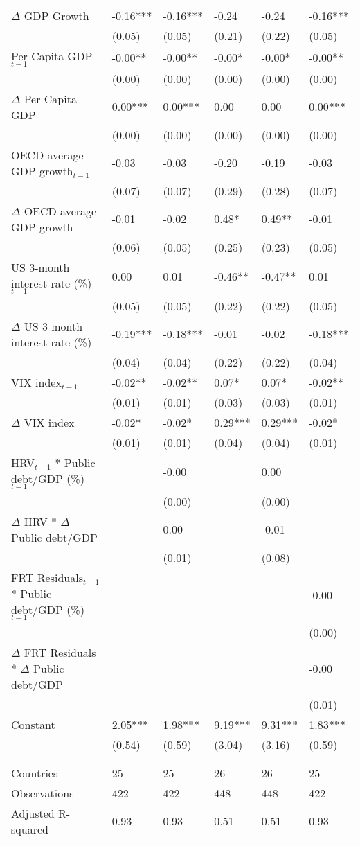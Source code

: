 \begin{tabular}{lp{3cm}p{3cm}p{3cm}p{3cm}p{3cm}}
  $\Delta$ GDP Growth & -0.16*** & -0.16*** & -0.24 & -0.24 & -0.16*** \\ 
   & (0.05) & (0.05) & (0.21) & (0.22) & (0.05) \\ 
  Per Capita GDP$_{t-1}$ & -0.00** & -0.00** & -0.00* & -0.00* & -0.00** \\ 
   & (0.00) & (0.00) & (0.00) & (0.00) & (0.00) \\ 
  $\Delta$ Per Capita GDP & 0.00*** & 0.00*** & 0.00 & 0.00 & 0.00*** \\ 
   & (0.00) & (0.00) & (0.00) & (0.00) & (0.00) \\ 
  OECD average GDP growth$_{t-1}$ & -0.03 & -0.03 & -0.20 & -0.19 & -0.03 \\ 
   & (0.07) & (0.07) & (0.29) & (0.28) & (0.07) \\ 
  $\Delta$ OECD average GDP growth & -0.01 & -0.02 & 0.48* & 0.49** & -0.01 \\ 
   & (0.06) & (0.05) & (0.25) & (0.23) & (0.05) \\ 
  US 3-month interest rate (\%)$_{t-1}$ & 0.00 & 0.01 & -0.46** & -0.47** & 0.01 \\ 
   & (0.05) & (0.05) & (0.22) & (0.22) & (0.05) \\ 
  $\Delta$ US 3-month interest rate (\%) & -0.19*** & -0.18*** & -0.01 & -0.02 & -0.18*** \\ 
   & (0.04) & (0.04) & (0.22) & (0.22) & (0.04) \\ 
  VIX index$_{t-1}$ & -0.02** & -0.02** & 0.07* & 0.07* & -0.02** \\ 
   & (0.01) & (0.01) & (0.03) & (0.03) & (0.01) \\ 
  $\Delta$ VIX index & -0.02* & -0.02* & 0.29*** & 0.29*** & -0.02* \\ 
   & (0.01) & (0.01) & (0.04) & (0.04) & (0.01) \\ 
  HRV$_{t-1}$ * Public debt/GDP (\%)$_{t-1}$ &  & -0.00 &  & 0.00 &  \\ 
   &  & (0.00) &  & (0.00) &  \\ 
  $\Delta$ HRV * $\Delta$ Public debt/GDP &  & 0.00 &  & -0.01 &  \\ 
   &  & (0.01) &  & (0.08) &  \\ 
  FRT Residuals$_{t-1}$ * Public debt/GDP (\%)$_{t-1}$ &  &  &  &  & -0.00 \\ 
   &  &  &  &  & (0.00) \\ 
  $\Delta$ FRT Residuals * $\Delta$ Public debt/GDP &  &  &  &  & -0.00 \\ 
   &  &  &  &  & (0.01) \\ 
  Constant & 2.05*** & 1.98*** & 9.19*** & 9.31*** & 1.83*** \\ 
   & (0.54) & (0.59) & (3.04) & (3.16) & (0.59) \\ 
   &  &  &  &  &  \\ 
   &  &  &  &  &  \\ 
  Countries & 25 & 25 & 26 & 26 & 25 \\ 
  Observations & 422 & 422 & 448 & 448 & 422 \\ 
  Adjusted R-squared & 0.93 & 0.93 & 0.51 & 0.51 & 0.93 \\ 
   \hline
\end{tabular}
\endgroup
